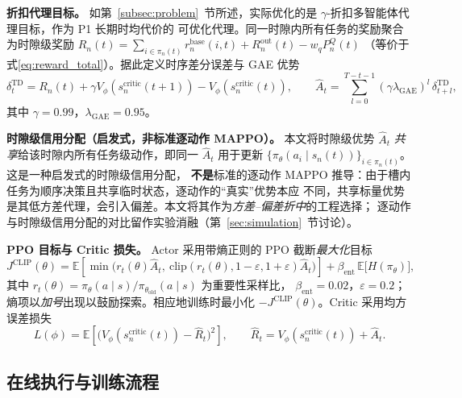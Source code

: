 \documentclass[a4paper,11pt]{article}
\begin{document}
\noindent\textbf{折扣代理目标。}
如第~\ref{subsec:problem}~节所述，实际优化的是 $\gamma$-折扣多智能体代理目标，作为 P1 长期时均代价的
可优化代理。同一时隙内所有任务的奖励聚合为时隙级奖励
$R_n(t) = \sum_{i \in \pi_n(t)} r^{\mathrm{base}}_n(i,t) + R^{\mathrm{out}}_n(t) - w_q P^Q_n(t)$
（等价于式\eqref{eq:reward_total}）。据此定义时序差分误差与 GAE 优势
\begin{equation}
\delta^{\mathrm{TD}}_t = R_n(t) + \gamma V_\phi(s^{\mathrm{critic}}_n(t\!+\!1))
- V_\phi(s^{\mathrm{critic}}_n(t)),
\qquad
\hat{A}_t = \sum_{l=0}^{T-t-1}
(\gamma\lambda_{\mathrm{GAE}})^l\,\delta^{\mathrm{TD}}_{t+l},
\label{eq:gae}
\end{equation}
其中 $\gamma=0.99$，$\lambda_{\mathrm{GAE}}=0.95$。

\noindent\textbf{时隙级信用分配（启发式，非标准逐动作 MAPPO）。}
本文将时隙级优势 $\hat{A}_t$ \emph{共享}给该时隙内所有任务级动作，即同一 $\hat{A}_t$ 用于更新
$\{\pi_\theta(a_i\mid s_n(t))\}_{i\in\pi_n(t)}$。这是一种启发式的时隙级信用分配，
\textbf{不是}标准的逐动作 MAPPO 推导：由于槽内任务为顺序决策且共享临时状态，逐动作的``真实''优势本应
不同，共享标量优势是其低方差代理，会引入偏差。本文将其作为\emph{方差--偏差折中}的工程选择；
逐动作与时隙级信用分配的对比留作实验消融（第~\ref{sec:simulation}~节讨论）。

\noindent\textbf{PPO 目标与 Critic 损失。}
Actor 采用带熵正则的 PPO 截断\emph{最大化}目标
\begin{equation}
J^{\mathrm{CLIP}}(\theta) = \mathbb{E}\!\left[
\min\!\big(r_t(\theta)\hat{A}_t,\
\mathrm{clip}(r_t(\theta), 1-\varepsilon, 1+\varepsilon)\hat{A}_t\big)
\right] + \beta_{\mathrm{ent}}\,\mathbb{E}\big[H(\pi_\theta)\big],
\label{eq:ppo}
\end{equation}
其中 $r_t(\theta) = \pi_\theta(a\mid s)/\pi_{\theta_{\mathrm{old}}}(a\mid s)$ 为重要性采样比，
$\beta_{\mathrm{ent}}=0.02$，$\varepsilon=0.2$；熵项以\emph{加号}出现以鼓励探索。相应地训练时最小化
$-J^{\mathrm{CLIP}}(\theta)$。Critic 采用均方误差损失
\begin{equation}
L(\phi) = \mathbb{E}\!\left[
\big(V_\phi(s^{\mathrm{critic}}_n(t)) - \hat{R}_t\big)^2
\right],
\qquad \hat{R}_t = V_\phi(s^{\mathrm{critic}}_n(t)) + \hat{A}_t.
\label{eq:critic_loss}
\end{equation}

\subsection{在线执行与训练流程}
\label{subsec:procedure}
\end{document}
